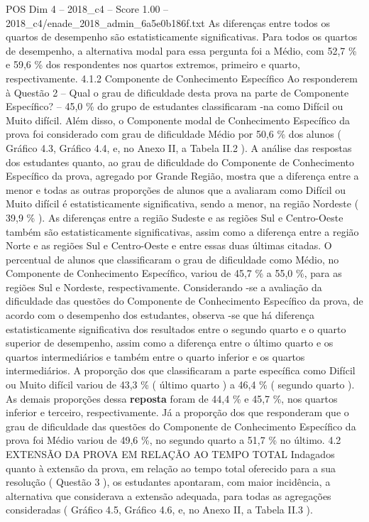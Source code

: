 \begin{textsample}{POS Dim 4 – 2018\_c4 – Score 1.00 – 2018\_c4/enade\_2018\_admin\_6a5e0b186f.txt}
As diferenças entre todos os quartos de desempenho são estatisticamente significativas.
Para todos os quartos de desempenho, a alternativa modal para essa pergunta foi a Médio, com 52,7 \% e 59,6 \% dos respondentes nos quartos extremos, primeiro e quarto, respectivamente. 4.1.2 Componente de Conhecimento Específico Ao responderem à Questão 2 – Qual o grau de dificuldade desta prova na parte de Componente Específico? – 45,0 \% do grupo de estudantes classificaram -na como Difícil ou Muito difícil.
Além disso, o Componente modal de Conhecimento Específico da prova foi considerado com grau de dificuldade Médio por 50,6 \% dos alunos ( Gráfico 4.3, Gráfico 4.4, e, no Anexo II, a Tabela II.2 ).
A análise das respostas dos estudantes quanto, ao grau de dificuldade do Componente de Conhecimento Específico da prova, agregado por Grande Região, mostra que a diferença entre a menor e todas as outras proporções de alunos que a avaliaram como Difícil ou Muito difícil é estatisticamente significativa, sendo a menor, na região Nordeste ( 39,9 \% ).
As diferenças entre a região Sudeste e as regiões Sul e Centro-Oeste também são estatisticamente significativas, assim como a diferença entre a região Norte e as regiões Sul e Centro-Oeste e entre essas duas últimas citadas.
O percentual de alunos que classificaram o grau de dificuldade como Médio, no Componente de Conhecimento Específico, variou de 45,7 \% a 55,0 \%, para as regiões Sul e Nordeste, respectivamente.
Considerando -se a avaliação da dificuldade das questões do Componente de Conhecimento Específico da prova, de acordo com o desempenho dos estudantes, observa -se que há diferença estatisticamente significativa dos resultados entre o segundo quarto e o quarto superior de desempenho, assim como a diferença entre o último quarto e os quartos intermediários e também entre o quarto inferior e os quartos intermediários.
A proporção dos que classificaram a parte específica como Difícil ou Muito difícil variou de 43,3 \% ( último quarto ) a 46,4 \% ( segundo quarto ).
As demais proporções dessa \textbf{reposta} foram de 44,4 \% e 45,7 \%, nos quartos inferior e terceiro, respectivamente.
Já a proporção dos que responderam que o grau de dificuldade das questões do Componente de Conhecimento Específico da prova foi Médio variou de 49,6 \%, no segundo quarto a 51,7 \% no último. 4.2 EXTENSÃO DA PROVA EM RELAÇÃO AO TEMPO TOTAL Indagados quanto à extensão da prova, em relação ao tempo total oferecido para a sua resolução ( Questão 3 ), os estudantes apontaram, com maior incidência, a alternativa que considerava a extensão adequada, para todas as agregações consideradas ( Gráfico 4.5, Gráfico 4.6, e, no Anexo II, a Tabela II.3 ).

\end{textsample}
